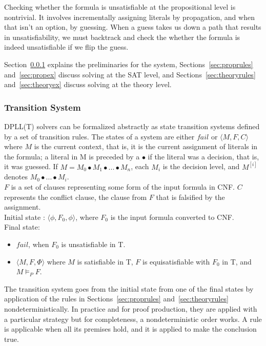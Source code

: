 \documentclass{article}
\begin{document}
Checking whether the formula is 
unsatisfiable at the propositional level is nontrivial.
It involves incrementally assigning literals by 
propagation, and when that isn't an option, by guessing.
When a guess takes us down a path that results in 
unsatisfiability, we must backtrack and check the 
whether the formula is indeed unsatisfiable if we 
flip the guess.

Section~\ref{sec:trans} explains the preliminaries for 
the system, Sections~\ref{sec:proprules} 
and~\ref{sec:propex} discuss solving at the SAT 
level, and Sections~\ref{sec:theoryrules} 
and~\ref{sec:theoryex} discuss solving at the 
theory level.


\subsubsection{Transition System}
\label{sec:trans}
DPLL(T) solvers can be formalized abstractly as 
state transition systems defined by a set of transition 
rules. The states of a system are either $fail$ or 
$\langle M, F, C \rangle$ where
$M$ is the current context, that is, it is the current 
assignment of literals in the formula; a literal in M is 
preceded by a $\bullet$ if the literal was a decision, 
that is, it was guessed. 
If $M = M_0 \bullet M_1 \bullet ... \bullet M_n$, 
each $M_i$ is the decision level, and $M^{[i]}$ 
denotes $M_0 \bullet ... \bullet M_i$. \\
$F$ is a set of clauses representing some form of
the input formula in CNF. $C$ represents the conflict clause,
the clause from $F$ that is falsified by the assignment. \\
Initial state : $\langle \phi, F_0, \phi \rangle$, where $F_0$
is the input formula converted to CNF. \\
Final state:
\begin{itemize}
	\item $fail$, when $F_0$ is unsatisfiable in T.
	\item $\langle M, F, \Phi \rangle$ where $M$ is satisfiable in
	T, $F$ is equisatisfiable with $F_0$ in T, and $M \models_P F$.
\end{itemize}

The transition system goes from the initial state from 
one of the final states by application of the rules in
Sections~\ref{sec:proprules} and~\ref{sec:theoryrules} 
nondeterministically. In practice and for proof production, 
they are applied with a particular strategy but for 
completeness, a nondeterministic order works. A rule 
is applicable when all its premises hold, and it 
is applied to make the conclusion true. 
\end{document}
